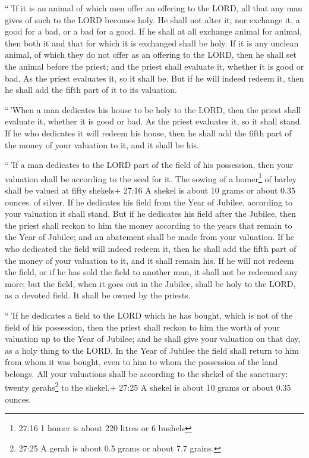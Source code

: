  ``\,'If it is an animal of which men offer an offering to
the LORD, all that any man gives of such to the LORD becomes holy.
 He shall not alter it, nor exchange it, a good for a bad,
or a bad for a good. If he shall at all exchange animal for animal, then
both it and that for which it is exchanged shall be holy. 
If it is any unclean animal, of which they do not offer as an offering
to the LORD, then he shall set the animal before the priest;
 and the priest shall evaluate it, whether it is good or
bad. As the priest evaluates it, so it shall be.  But if he
will indeed redeem it, then he shall add the fifth part of it to its
valuation.

 ``\,'When a man dedicates his house to be holy to the
LORD, then the priest shall evaluate it, whether it is good or bad. As
the priest evaluates it, so it shall stand.  If he who
dedicates it will redeem his house, then he shall add the fifth part of
the money of your valuation to it, and it shall be his.

 ``\,'If a man dedicates to the LORD part of the field of
his possession, then your valuation shall be according to the seed for
it. The sowing of a homer\footnote{27:16 1 homer is about 220 litres or
  6 bushels} of barley shall be valued at fifty shekels+ 27:16 A shekel
is about 10 grams or about 0.35 ounces. of silver.  If he
dedicates his field from the Year of Jubilee, according to your
valuation it shall stand.  But if he dedicates his field
after the Jubilee, then the priest shall reckon to him the money
according to the years that remain to the Year of Jubilee; and an
abatement shall be made from your valuation.  If he who
dedicated the field will indeed redeem it, then he shall add the fifth
part of the money of your valuation to it, and it shall remain his.
 If he will not redeem the field, or if he has sold the
field to another man, it shall not be redeemed any more; 
but the field, when it goes out in the Jubilee, shall be holy to the
LORD, as a devoted field. It shall be owned by the priests.

 ``\,'If he dedicates a field to the LORD which he has
bought, which is not of the field of his possession,  then
the priest shall reckon to him the worth of your valuation up to the
Year of Jubilee; and he shall give your valuation on that day, as a holy
thing to the LORD.  In the Year of Jubilee the field shall
return to him from whom it was bought, even to him to whom the
possession of the land belongs.  All your valuations shall
be according to the shekel of the sanctuary: twenty gerahs\footnote{27:25
  A gerah is about 0.5 grams or about 7.7 grains.} to the shekel.+ 27:25
A shekel is about 10 grams or about 0.35 ounces.

